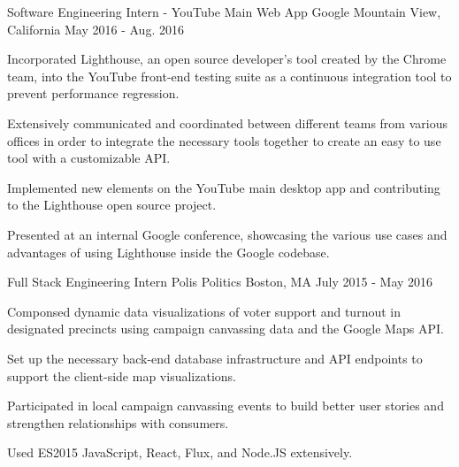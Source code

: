 


\begin{cventries}


\cventry
{Software Engineering Intern - YouTube Main Web App} %
{Google} %
{Mountain View, California} %
{May 2016 - Aug. 2016} %
{ %
\begin{cvitems}
\item {Incorporated Lighthouse, an open
source developer's tool created by the Chrome team, into the YouTube front-end
testing suite as a continuous integration tool to prevent performance
regression.}
\item {Extensively communicated and coordinated between
different teams from various offices in order to integrate the necessary tools
together to create an easy to use tool with a customizable API.}
\item {Implemented new elements on the YouTube main desktop app
and contributing to the Lighthouse open source project.}
\item {Presented at an internal Google conference, showcasing the various use
cases and advantages of using Lighthouse inside the Google codebase.}
\end{cvitems}
}


\cventry
{Full Stack Engineering Intern} %
{Polis Politics} %
{Boston, MA} %
{July 2015 - May 2016} %
{ %
\begin{cvitems}
\item{Componsed dynamic data visualizations of voter support and turnout in
designated precincts using campaign canvassing data and the Google Maps API.}
\item {Set up the necessary back-end database infrastructure and API endpoints
to support the client-side map visualizations.}
\item {Participated in local campaign canvassing events to build better user
stories and strengthen relationships with consumers.}
\item {Used ES2015 JavaScript, React, Flux, and Node.JS extensively.}
\end{cvitems}
}


\end{cventries}
